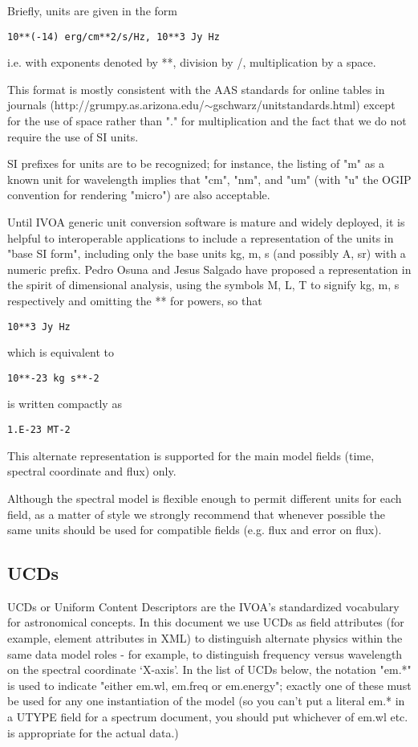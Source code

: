 \documentclass[11pt]{article}
\begin{document}
Briefly, units are given in the form
\begin{verbatim}
10**(-14) erg/cm**2/s/Hz, 10**3 Jy Hz
\end{verbatim}

i.e. with exponents denoted by **, division by /, multiplication by a space.

This format is mostly consistent with the 
AAS standards for online tables in journals
(http://grumpy.as.arizona.edu/$\sim$gschwarz/unitstandards.html)
except for the use of space rather than "." for multiplication and the 
fact that we do not require the use of SI units.

SI prefixes for units are to be recognized; for instance, the listing of
"m" as a known unit for wavelength implies that "cm", "nm", and "um" (with
"u" the OGIP convention for rendering "micro") are also acceptable.

Until IVOA generic unit conversion software is mature and widely deployed, 
it is helpful to interoperable applications to include a representation
of the units in "base SI form", including only the base units kg, m, s (and
possibly A, sr) with a numeric prefix. Pedro Osuna and Jesus Salgado have proposed
a representation in the spirit of dimensional analysis, using the symbols
M, L, T to signify kg, m, s respectively and omitting the ** for powers, so
that 
\begin{verbatim}
10**3 Jy Hz
\end{verbatim}
which is equivalent to
\begin{verbatim}
10**-23 kg s**-2
\end{verbatim}
is written compactly as
\begin{verbatim}
1.E-23 MT-2
\end{verbatim}

This alternate representation is supported for the
main model fields (time, spectral coordinate and flux) only.



Although the spectral model is flexible enough to permit different units
for each field, as a matter of style we strongly recommend that whenever
possible the
same units should be used for compatible fields (e.g. flux and error on flux).

\subsection{UCDs}

UCDs or Uniform Content Descriptors are the IVOA's standardized vocabulary
for astronomical concepts. In this document we use UCDs as field attributes
(for example, element attributes in XML) to distinguish alternate 
physics within the same data model roles - for example, to distinguish
frequency versus wavelength on the spectral coordinate `X-axis'.
In the list of UCDs below, the notation "em.*" is used to indicate "either
em.wl, em.freq or em.energy"; exactly one of these must be used for
any one instantiation of the model (so you can't put a literal em.* in
a UTYPE field for a spectrum document, you should put whichever of
em.wl etc. is appropriate for the actual data.)
\end{document}
